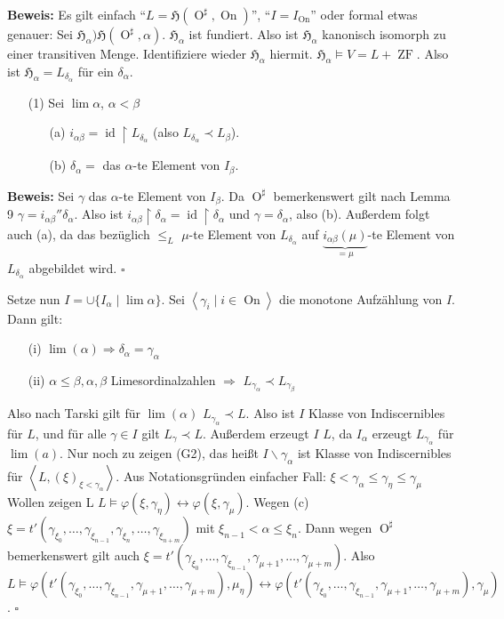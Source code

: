 \documentclass[a4paper,fontsize=11pt]{scrartcl}
\newcommand{\osharp}{\operatorname{O}^\sharp}
\newcommand{\ZF}{\operatorname{ZF}}
\newcommand{\On}{\operatorname{On}}
\newcommand{\id}{\operatorname{id}}
\begin{document}
{\bf Beweis:} Es gilt einfach ``$L=\mathfrak{H}(\osharp,\On)$'',
``$I=I_{\On}$'' oder formal etwas genauer: Sei
$\mathfrak{H}_\alpha)\mathfrak{H}(\osharp,\alpha)$. $\mathfrak{H}_\alpha$
ist fundiert. Also ist $\mathfrak{H}_\alpha$ kanonisch isomorph zu
einer transitiven Menge. Identifiziere wieder $\mathfrak{H}_\alpha$
hiermit. $\mathfrak{H}_\alpha\models V=L+\ZF$. Also ist
$\mathfrak{H}_\alpha=L_{\delta_\alpha}$ für ein $\delta_\alpha$.
\begin{itemize}
\item[(1)] Sei $\lim \alpha$, $\alpha<\beta$
  \begin{itemize}
  \item[(a)] $i_{\alpha\beta}=\id\upharpoonright L_{\delta_\alpha}$
    (also $L_{\delta_\alpha}\prec L_\beta$).
  \item[(b)] $\delta_\alpha=$ das $\alpha$-te Element von $I_\beta$.
  \end{itemize}
\end{itemize}
{\bf Beweis:} Sei $\gamma$ das $\alpha$-te Element von $I_\beta$. Da
$\osharp$ bemerkenswert gilt nach Lemma 9
$\gamma=i_{\alpha\beta}''\delta_\alpha$. Also ist
$i_{\alpha\beta}\upharpoonright\delta_\alpha=\id\upharpoonright\delta_\alpha$
und $\gamma=\delta_\alpha$, also (b). Außerdem folgt auch (a), da das
bezüglich $\le_L$ $\mu$-te Element von $L_{\delta_\alpha}$ auf
$\underbrace{i_{\alpha\beta}(\mu)}_{=\mu}$-te Element von
$L_{\delta_\alpha}$ abgebildet wird.
\hfill $\square$

Setze nun $I=\cup\{I_\alpha\mid\lim\alpha\}$. Sei $\left<\gamma_i\mid
i\in\On\right>$ die monotone Aufzählung von $I$. Dann gilt:
\begin{itemize}
\item[(i)] $\lim(\alpha)\Rightarrow\delta_\alpha=\gamma_\alpha$
\item[(ii)] $\alpha\le\beta,\alpha,\beta$ Limesordinalzahlen
  $\Rightarrow$ $L_{\gamma_\alpha}\prec L_{\gamma_\beta}$
\end{itemize}
Also nach Tarski gilt für $\lim(\alpha)$ $L_{\gamma_\alpha}\prec
L$. Also ist $I$ Klasse von Indiscernibles für $L$, und für alle
$\gamma\in I$ gilt $L_\gamma\prec L$. Außerdem erzeugt $I$ $L$, da
$I_\alpha$ erzeugt $L_{\gamma_\alpha}$ für $\lim(a)$. Nur noch zu
zeigen (G2), das heißt $I\backslash\gamma_\alpha$ ist Klasse von
Indiscernibles für $\left<L,(\xi)_{\xi<\gamma_\alpha}\right>$. Aus
Notationsgründen einfacher Fall: $ \xi < \gamma_\alpha \le \gamma_\eta
\le \gamma_\mu $ Wollen zeigen L
$L\models\varphi(\xi,\gamma_\eta)\leftrightarrow\varphi(\xi,\gamma_\mu)$. Wegen
(c)
$\xi=t'(\gamma_{\xi_0},\ldots,\gamma_{\xi_{n-1}},\gamma_{\xi_n},\ldots,\gamma_{\xi_{n+m}})$
mit $\xi_{n-1}<\alpha\le\xi_n$. Dann wegen $\osharp$ bemerkenswert
gilt auch
$\xi=t'(\gamma_{\xi_0},\ldots,\gamma_{\xi_{n-1}},\gamma_{\mu+1},\ldots,\gamma_{\mu+m})$. Also
$L\models\varphi(t'(\gamma_{\xi_0},\ldots,\gamma_{\xi_{n-1}},\gamma_{\mu+1},\ldots,\gamma_{\mu+m}),\mu_\eta)\leftrightarrow\varphi(t'(\gamma_{\xi_0},\ldots,\gamma_{\xi_{n-1}},\gamma_{\mu+1},\ldots,\gamma_{\mu+m}),\gamma_\mu)$.
\hfill $\square$
\end{document}
